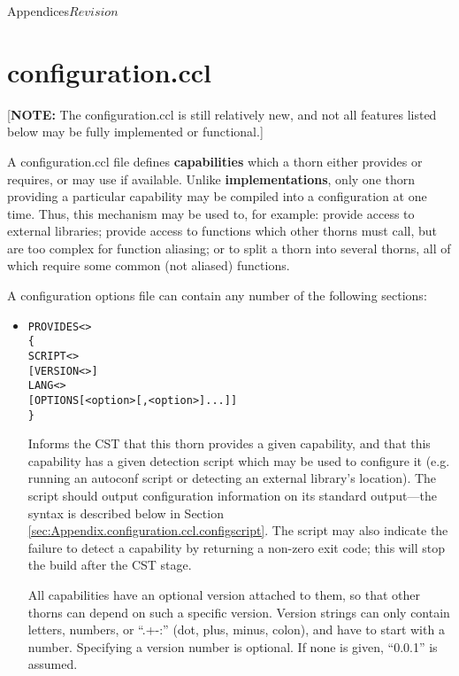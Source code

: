 \begin{cactuspart}{Appendices}{}{$Revision$}

\section{configuration.ccl}
\label{sec:Appendix.configuration.ccl}

[{\bf NOTE:} The configuration.ccl is still relatively new, and not
all features listed below may be fully implemented or functional.]

A configuration.ccl file defines {\bf capabilities} which a thorn
either provides or requires, or may use if available.  Unlike {\bf
implementations}, only one thorn providing a particular capability may
be compiled into a configuration at one time.  Thus, this mechanism may
be used to, for example: provide access to external libraries; provide
access to functions which other thorns must call, but are too complex
for function aliasing; or to split a thorn into several thorns, all of
which require some common (not aliased) functions.

A configuration options file can contain any number of the following
sections:

\begin{itemize}

\item

\begin{alltt}
PROVIDES <>
\{
  SCRIPT <>
  [VERSION <>]
  LANG <>
  [OPTIONS [<option>[,<option>]...]]
\}
\end{alltt}

Informs the CST that this thorn provides a given capability, and that
this capability has a given detection script which may be used to
configure it (e.g. running an autoconf script or detecting an external
library's location).  The script should output configuration
information on its standard output---the syntax is described below
in Section \ref{sec:Appendix.configuration.ccl.configscript}.  The
script may also indicate the failure to detect a capability by
returning a non-zero exit code;  this will stop the build after the
CST stage.

All capabilities have an optional version attached to them, so that other
thorns can depend on such a specific version. Version strings can only contain
letters, numbers, or ``.+-:'' (dot, plus, minus, colon), and have to start with
a number. Specifying a version number is optional. If none is given, ``0.0.1''
is assumed.


\end{itemize}
\end{cactuspart}
